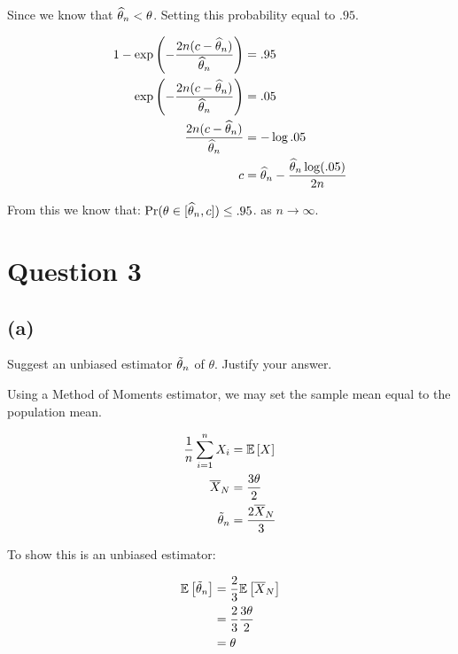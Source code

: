 \documentclass[12pt]{paper}
\begin{document}
Since we know that $\widehat{ \theta }_{n} < \theta$. Setting this probability equal to
$.95$.

\begin{align*}
  1 - \exp \left( - \frac{2n ( c - \widehat{ \theta }_{n})}{\widehat{ \theta }_{n}} \right) &= .95\\
  \exp \left( - \frac{2n ( c - \widehat{ \theta }_{n})}{\widehat{ \theta }_{n}} \right) &= .05\\
  \frac{2n ( c - \widehat{ \theta }_{n})}{\widehat{ \theta }_{n}} &= - \log .05\\
  c &= \widehat{ \theta }_{n} - \frac{\widehat{ \theta }_{n}\log(.05)}{2n}
\end{align*}

From this we know that: $\Pr( \theta \in [\widehat{ \theta }_{n}, c] ) \leq .95$. as $n \rightarrow \infty$.

\section{Question 3}

\subsection{(a)}

Suggest an unbiased estimator $\tilde{ \theta }_{n}$ of $\theta$. Justify your
answer.

Using a Method of Moments estimator, we may set the sample mean equal
to the population mean.

\begin{align*}
  \frac{1}{n} \sum_{i=1}^n X_i &= \mathbb{E} \left [ X \right ]\\
  \overline{ X }_{N} &= \frac{3 \theta}{2}\\
  \tilde{ \theta }_{n} &= \frac{2 \overline{ X }_{N}}{3}
\end{align*}


To show this is an unbiased estimator:

\begin{align*}
  \mathbb{E} \left [ \tilde{ \theta }_{n} \right ] &= \frac{2}{3}\mathbb{E} \left [  \overline{ X }_{N} \right ]\\
                   &= \frac{2}{3} \frac{3\theta}{2}\\
                   &= \theta
\end{align*}
\end{document}
